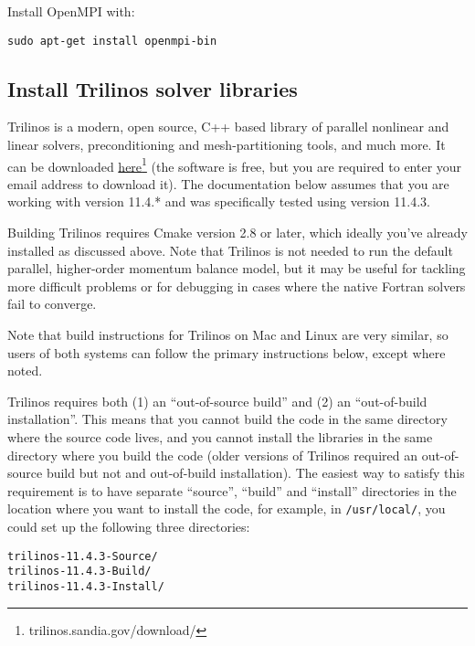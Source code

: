 \begin{mdframed}[style=ubuntu] %
Install OpenMPI with:

\texttt{sudo apt-get install openmpi-bin}
\end{mdframed}                 %



\subsection{Install Trilinos solver libraries}

Trilinos is a modern, open source, C++ based library of parallel nonlinear and linear solvers, 
preconditioning and mesh-partitioning tools, and much more. It can be downloaded 
\href{trilinos.sandia.gov/download/}{here}\footnote{trilinos.sandia.gov/download/}
 (the software is free, but you are required to enter your email address to download it). 
The documentation below assumes that you are working with version 11.4.* and was specifically 
tested using version 11.4.3. 

Building Trilinos requires Cmake version 2.8 or later, which ideally you've already 
installed as discussed above. Note that Trilinos is not needed to run the default 
parallel, higher-order momentum balance model, but it may be useful for tackling 
more difficult problems or for debugging in cases where the native Fortran solvers 
fail to converge.

Note that build instructions for Trilinos on Mac and Linux are very similar, so users
of both systems can follow the primary instructions below, except where noted.

Trilinos requires both (1) an ``out-of-source build'' and (2) an ``out-of-build installation''. 
This means that you cannot build the code in the same directory where the source code lives, 
and you cannot install the libraries in the same directory where you build the code 
(older versions of Trilinos required an out-of-source build but not and out-of-build installation). 
The easiest way to satisfy this requirement is to have separate ``source'', ``build'' and 
``install'' directories in the location where you want to install the code, 
for example, in \texttt{/usr/local/}, you could set up the following three directories:

\begin{verbatim}
trilinos-11.4.3-Source/
trilinos-11.4.3-Build/
trilinos-11.4.3-Install/
\end{verbatim}

